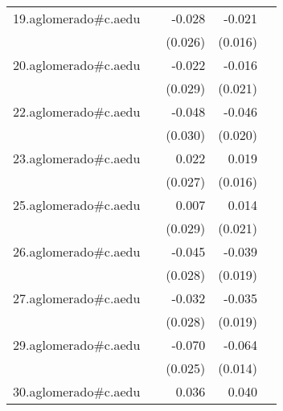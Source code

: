 {\begin{longtable}{l*{4}{D{.}{.}{-1}}}
\addlinespace
19.aglomerado#c.aedu&                     &      -0.028         &      -0.021         &                     \\
            &                     &     (0.026)         &     (0.016)         &                     \\
\addlinespace
20.aglomerado#c.aedu&                     &      -0.022         &      -0.016         &                     \\
            &                     &     (0.029)         &     (0.021)         &                     \\
\addlinespace
22.aglomerado#c.aedu&                     &      -0.048         &      -0.046\sym{*}  &                     \\
            &                     &     (0.030)         &     (0.020)         &                     \\
\addlinespace
23.aglomerado#c.aedu&                     &       0.022         &       0.019         &                     \\
            &                     &     (0.027)         &     (0.016)         &                     \\
\addlinespace
25.aglomerado#c.aedu&                     &       0.007         &       0.014         &                     \\
            &                     &     (0.029)         &     (0.021)         &                     \\
\addlinespace
26.aglomerado#c.aedu&                     &      -0.045         &      -0.039\sym{*}  &                     \\
            &                     &     (0.028)         &     (0.019)         &                     \\
\addlinespace
27.aglomerado#c.aedu&                     &      -0.032         &      -0.035         &                     \\
            &                     &     (0.028)         &     (0.019)         &                     \\
\addlinespace
29.aglomerado#c.aedu&                     &      -0.070\sym{**} &      -0.064\sym{***}&                     \\
            &                     &     (0.025)         &     (0.014)         &                     \\
\addlinespace
30.aglomerado#c.aedu&                     &       0.036         &       0.040\sym{*}  &                     \\

\end{longtable}}
